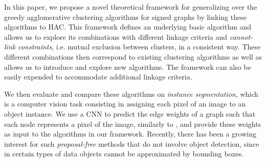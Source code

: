 
In this paper, we propose a novel theoretical framework for generalizing over the greedy agglomerative clustering algorithms for signed graphs by linking these algorithms to HAC. This framework defines an underlying basic algorithm and allows us to explore its combinations with different linkage criteria and \emph{cannot-link constraints}, i.e. mutual exclusion between clusters, in a consistent way. These different combinations then correspond to existing clustering algorithms as well as allows us to introduce and explore new algorithms. The framework can also be easily expended to accommodate additional linkage criteria.


We then evaluate and compare these algorithms on \emph{instance segmentation}, which is a computer vision task consisting in assigning each pixel of an image to an object instance. %
We use a CNN to predict the edge weights of a graph such that each node represents a pixel of the image, similarly to \cite{liu2018affinity,lee2017superhuman,wolf2018mutex}, and provide these weights as input to the algorithms in our framework.
Recently, there has been a growing interest for such \emph{proposal-free} methods that do not involve object detection, since in certain types of data objects cannot be approximated by bounding boxes.

